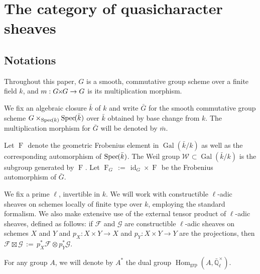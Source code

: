 \documentclass{amsart}
\theoremstyle{plain}
\theoremstyle{definition}
\theoremstyle{remark}
\newcommand{\EE}{\mathbb{\bar Q}_\ell}
\newcommand{\bFq}{\bar{k}}
\newcommand{\Fq}{k}
\newcommand{\EEx}{\EE^\times}
\newcommand{\Weil}[1]{\mathcal{W}_{#1}}
\DeclareMathOperator{\Gal}{Gal}
\newcommand{\Frob}[1]{\operatorname{F}_{#1}}
\DeclareMathOperator{\Hom}{Hom}
\DeclareMathOperator{\id}{id}
\newcommand{\Spec}[1]{{\operatorname{Spec}\hskip-1pt( #1 )}}
\newcommand{\ceq}{{\, :=\, }}
\newcommand{\QC}{{\mathcal{Q\hskip-0.8pt C}}}
\newcommand{\bm}{\bar{m}}
\newcommand{\bG}{\bar{G}}
\newcommand{\tight}[3]{\hspace{-#1pt}{#2}\hspace{-#3pt}}
\newcommand{\GxG}{\text{$G \tight{1}{\times}{1} G$}}
\begin{document}

\tableofcontents

\section{The category of quasicharacter sheaves}


\subsection{Notations}\label{sec:QCschemes}

Throughout this paper, $G$ is a smooth, commutative group scheme
over a finite field $\Fq$, and $m : \GxG\to G$ is its multiplication morphism.

We fix an algebraic closure $\bFq$ of $\Fq$ and write $\bG$ for the
smooth commutative group scheme $G \times_{\Spec{\Fq}} \Spec{\bFq}$ over $\bFq$
obtained by base change from $k$. The multiplication morphism for $\bG$ will be denoted by $\bm$.

Let $\Frob{}$ denote the geometric Frobenius element in $\Gal(\bFq/\Fq)$ as
well as the corresponding automorphism of $\Spec{\bFq}$. The Weil group
$\Weil{}\subset \Gal(\bFq/\Fq)$ is the subgroup generated by $\Frob{}$.
Let $\Frob{G} \ceq \id_{G} \times \Frob{}$ be the Frobenius automorphism of $\bG$.

We fix a prime $\ell$, invertible in $\Fq$.
We will work with constructible $\ell$-adic sheaves 
on schemes locally of finite type over $\Fq$, employing the standard formalism.
We also make extensive use of the external tensor product of $\ell$-adic sheaves,
defined as follows: if $\mathcal{F}$ and $\mathcal{G}$ are constructible $\ell$-adic
sheaves on schemes $X$ and $Y$ and $p_X : X\times Y\to X$ and $p_Y : X\times Y \to Y$
are the projections, then $\mathcal{F}\boxtimes \mathcal{G} \ceq p_X^* \mathcal{F} \otimes p_Y^*\mathcal{G}$.

For any group $A$, we will denote by $A^*$ the dual group $\Hom_\text{grp}(A, \EEx)$.
\end{document}
